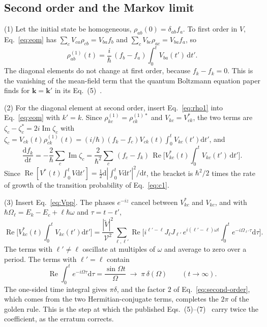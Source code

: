 \documentclass[11pt]{article}
\numberwithin{equation}{section}
\newcommand{\Vol}{\mathcal V}
\newcommand{\dd}{\mathrm d}
\DeclareMathOperator{\Imag}{Im}
\DeclareMathOperator{\Real}{Re}
\begin{document}
\subsection{Second order and the Markov limit}
{\noindent}(1) Let the initial state be homogeneous, $\rho_{ab}(0)=\delta_{ab}f_a$.
To first order in $V$, Eq.~\eqref{eq:eom} has $\sum_cV_{ca}\rho_{cb}=V_{ba}f_b$
and $\sum_cV_{bc}\rho_{ac}=V_{ba}f_a$, so
\begin{equation}
\rho^{(1)}_{ab}(t)=\frac i\hbar\,(f_b-f_a)\int_0^tV_{ba}(t')\,\dd t'.
\label{eq:rho1}
\end{equation}
The diagonal elements do not change at first order, because
$f_k-f_k=0$. This is the vanishing of the mean-field term that the quantum
Boltzmann equation paper finds for $\mathbf k=\mathbf k'$ in its Eq.~(5)~\cite{Watson2026}.

{\noindent}(2) For the diagonal element at second order, insert
Eq.~\eqref{eq:rho1} into Eq.~\eqref{eq:eom} with $k'=k$. Since
$\rho^{(1)}_{kc}=\rho^{(1)*}_{ck}$ and $V_{kc}=V^*_{ck}$, the two terms are
$\zeta_c-\zeta^*_c=2i\Imag\zeta_c$ with
$\zeta_c=V_{ck}(t)\rho^{(1)}_{ck}(t)=(i/\hbar)(f_k-f_c)V_{ck}(t)\int_0^tV_{kc}(t')\dd t'$, and
\begin{equation}
\frac{\dd f_k}{\dd t}=-\frac2\hbar\sum_c\Imag\zeta_c
=\frac{2}{\hbar^2}\sum_c\,(f_c-f_k)\,\Real\Big[V^*_{kc}(t)\int_0^tV_{kc}(t')\,\dd t'\Big].
\label{eq:second-order}
\end{equation}
Since $\Real[V^*(t)\int_0^tV\dd t']=\tfrac12\dd|\int_0^tV\dd t'|^2/\dd t$, the
bracket is $\hbar^2/2$ times the rate of growth of the transition probability of
Eq.~\eqref{eq:c1}.

{\noindent}(3) Insert Eq.~\eqref{eq:Vpp}. The phases $e^{-iz}$ cancel between
$V^*_{kc}$ and $V_{kc}$, and with $\hbar\Omega_\ell=E_k-E_c+\ell\hbar\omega$ and
$\tau=t-t'$,
\begin{equation}
\Real\Big[V^*_{kc}(t)\int_0^tV_{kc}(t')\dd t'\Big]
=\frac{|\tilde V|^2}{\Vol^2}\sum_{\ell,\ell'}\Real\Big[i^{\ell'-\ell}J_\ell J_{\ell'}\,
e^{i(\ell'-\ell)\omega t}\int_0^te^{-i\Omega_{\ell'}\tau}\dd\tau\Big].
\end{equation}
The terms with $\ell'\neq\ell$ oscillate at multiples of $\omega$ and average to
zero over a period. The terms with $\ell'=\ell$ contain
\begin{equation}
\Real\int_0^te^{-i\Omega\tau}\dd\tau=\frac{\sin\Omega t}{\Omega}\;\longrightarrow\;\pi\,\delta(\Omega)\qquad(t\to\infty).
\label{eq:markov}
\end{equation}
The one-sided time integral gives $\pi\delta$, and the factor $2$ of
Eq.~\eqref{eq:second-order}, which comes from the two Hermitian-conjugate
terms, completes the $2\pi$ of the golden rule. This is the step at which the
published Eqs.~(5)--(7)~\cite{Watson2026} carry twice the coefficient, as the
erratum \cite{Watson2026erratum} corrects.
\end{document}
